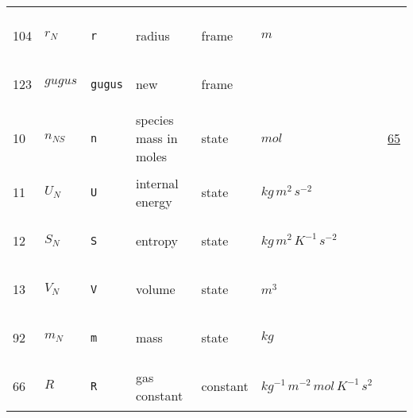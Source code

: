 \begin{longtable}{|p{1cm}|p{3cm}|p{5cm}|p{7.5cm}|p{3.0cm}|p{3cm}|p{1cm}|}
             & \\
    104
             & \hypertarget{"v:104"}{ $ {r}_{N} $}
             & \verb|r|
             & radius
             & \begin{lay}frame \end{lay}
             & $ m  $
             & \\
    123
             & \hypertarget{"v:123"}{ $ {gugus}_{} $}
             & \verb|gugus|
             &  new 
             & \begin{lay}frame \end{lay}
             & $  $
             & \\
    10
             & \hypertarget{"v:10"}{ $ {n}_{{N S}} $}
             & \verb|n|
             & species mass in moles
             & \begin{lay}state \end{lay}
             & $ mol \, $
             & \hyperlink{"e:65"}{ 65 }
                 \\
    11
             & \hypertarget{"v:11"}{ $ {U}_{N} $}
             & \verb|U|
             & internal energy
             & \begin{lay}state \end{lay}
             & $ kg \,m^{2} \,s^{-2} \, $
             & \\
    12
             & \hypertarget{"v:12"}{ $ {S}_{N} $}
             & \verb|S|
             & entropy
             & \begin{lay}state \end{lay}
             & $ kg \,m^{2} \,K^{-1} \,s^{-2} \, $
             & \\
    13
             & \hypertarget{"v:13"}{ $ {V}_{N} $}
             & \verb|V|
             & volume
             & \begin{lay}state \end{lay}
             & $ m^{3} \, $
             & \\
    92
             & \hypertarget{"v:92"}{ $ {m}_{N} $}
             & \verb|m|
             & mass
             & \begin{lay}state \end{lay}
             & $ kg \, $
             & \\
    66
             & \hypertarget{"v:66"}{ $ {R}_{} $}
             & \verb|R|
             & gas constant
             & \begin{lay}constant \end{lay}
             & $ kg^{-1} \,m^{-2} \,mol \,K^{-1} \,s^{2} \, $

\end{longtable}
